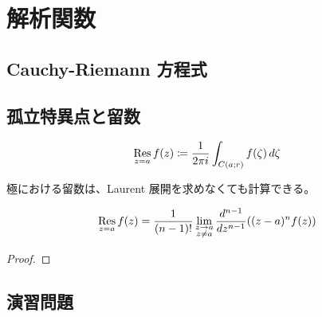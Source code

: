 \documentclass[report]{jlreq}
\begin{document}
%
\chapter{解析関数}

%
\section{Cauchy-Riemann 方程式}

%
\section{孤立特異点と留数}

\begin{definition}[孤立特異点]
    \TODO{}
\end{definition}

\begin{definition}[留数]
    \begin{equation}
        \operatorname*{Res}_{z = a} f(z) \coloneqq
            \frac{1}{2\pi i}
            \int_{C(a; r)} f(\zeta) \, d\zeta
    \end{equation}
    \TODO{}
\end{definition}

極における留数は、Laurent 展開を求めなくても計算できる。

\begin{proposition}[極における留数]
    \begin{equation}
        \operatorname*{Res}_{z = a} f(z)
            = \frac{1}{(n - 1)!}
            \lim_{\substack{z \to a \\ z \neq a}}
            \frac{d^{n - 1}}{dz^{n - 1}} ((z - a)^n f(z))
    \end{equation}
    \TODO{}
\end{proposition}

\begin{proof}
    \TODO{}
\end{proof}

%
\newpage
\section{演習問題}
\end{document}
